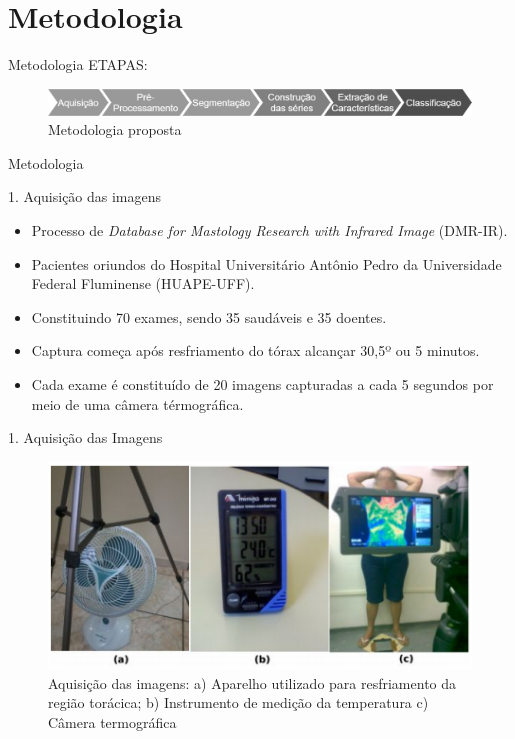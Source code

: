 \documentclass[apesctratio=169]{beamer}
\begin{document}
	\section{Metodologia}
	
	\begin{frame}{Metodologia}
	    ETAPAS:
	    
        \begin{figure}[H]
			     \includegraphics[scale=0.26]{etapas.PNG}
			     \caption{Metodologia proposta}
		\end{figure}
	\end{frame}
	
	\begin{frame}{Metodologia}
	    \begin{block}{1. Aquisição das imagens}
	             \begin{itemize}
	                 \item Processo de \textit{Database for Mastology Research with Infrared Image} (DMR-IR).
	                 \item Pacientes oriundos do Hospital Universitário Antônio Pedro da Universidade Federal Fluminense (HUAPE-UFF).
	                 \item Constituindo 70 exames, sendo 35 saudáveis e 35 doentes.
	                 \item Captura começa após resfriamento do tórax alcançar 30,5º ou 5 minutos.
	                 \item Cada exame é constituído de 20 imagens capturadas a cada 5 segundos por meio de uma câmera térmográfica.
	            \end{itemize}
	        \end{block}
	\end{frame} 
	
    \begin{frame}{1. Aquisição das Imagens}
        \begin{figure}[H]
			     \includegraphics[scale=0.7]{etapa1.PNG}
			     \caption{Aquisição das imagens: a) Aparelho utilizado para resfriamento da região torácica; b) Instrumento de medição da temperatura c) Câmera termográfica}
		\end{figure}
	\end{frame}
	
\end{document}
